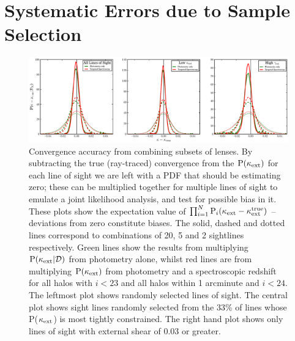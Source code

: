 \documentclass[useAMS,usenatbib]{mn2e}
\begin{document}


\section{Systematic Errors due to Sample Selection}
\label{sec:bias}

\begin{figure}
\includegraphics[width=\textwidth]{figs/biasplots.eps}
\caption{Convergence accuracy from combining subsets of
lenses. By subtracting the true (ray-traced) convergence from the
\infered ${\rm P}(\kappa_{\rm ext})$ for each line of sight we are left with a PDF that
should be estimating zero; these can be multiplied together for multiple
lines of sight to emulate a joint likelihood analysis, and 
test for possible bias in it. These plots show the
expectation value of $\prod_{i=1}^N {\rm P}_i(\kappa_{\rm ext}-\kappa_{\rm ext}^{\rm true})$ --
deviations from zero constitute biases. The solid, dashed and dotted
lines correspond to combinations of 
20, 5 and 2 sightlines respectively. Green lines show the results
from multiplying ${\rm P}(\kappa_{\rm ext}|{\mathcal{D}})$ \infered from photometry alone, whilst red
lines are from multiplying ${\rm P}(\kappa_{\rm ext})$ \infered from photometry and a
spectroscopic redshift for all halos with $i<23$ and all halos within 1
arcminute and $i<24$. The leftmost plot shows randomly selected lines
of sight. The central plot shows sight lines randomly selected from the
33\% of lines whose P($\kappa_{\rm ext}$) is most tightly constrained. The right
hand plot shows only lines of sight with external shear of 0.03 or
greater.}
\label{fig:biasplots}
\end{figure}
\end{document}
